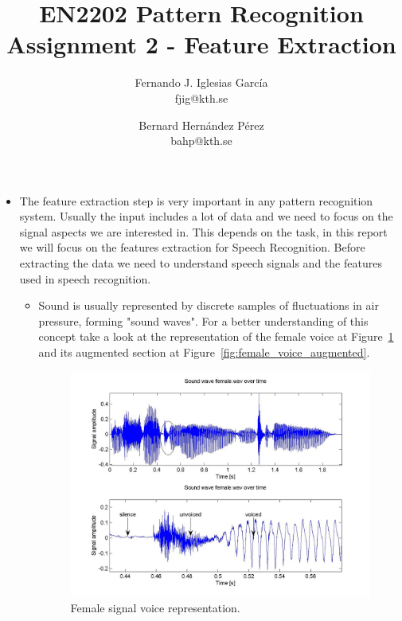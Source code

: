 \documentclass[a4paper]{article}
\begin{document}
\title{EN2202 Pattern Recognition\\
Assignment 2 - Feature Extraction}
\author{Fernando J. Iglesias Garc\'{i}a \\ fjig@kth.se
	\and
	Bernard Hern\'{a}ndez P\'{e}rez \\ bahp@kth.se }

\maketitle

\begin{itemize}
	\item 	The feature extraction step is very important in any pattern recognition system. Usually the input includes a lot of 
		data and we need to focus on the signal aspects we are interested in. This depends on the task, in this report we 
		will focus on the features extraction for Speech Recognition. Before extracting the data we need to understand 
		speech signals and the features used in speech recognition.

	\begin{itemize}
		\item	Sound is usually represented by discrete samples of fluctuations in air pressure, forming "sound waves". 
			For a better understanding of this concept take a look at the representation of the female voice at 
			Figure~\ref{fig:female_voice} and its augmented section at Figure~\ref{fig:female_voice_augmented}.

			\begin{figure}[!ht]
			\centering
			\includegraphics[width=0.85\columnwidth]{figures/2_1.jpg}
			\caption{Female signal voice representation.}
			\label{fig:female_voice}
			\end{figure}


\end{itemize}
\end{itemize}
\end{document}
